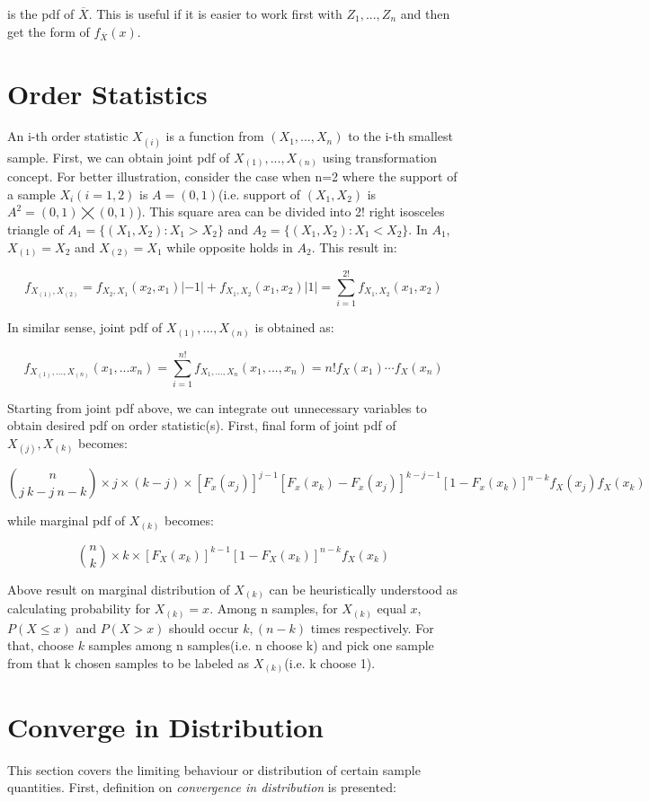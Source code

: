 \documentclass[10pt]{article}
\begin{document}
\noindent is the pdf of $\overline{X}$. This is useful if it is easier to work first with $Z_1,...,Z_n$ and then get the form of $f_{\overline{X}}(x)$.

\section{Order Statistics}
An i-th order statistic $X_{(i)}$ is a function from $(X_1,...,X_n)$ to the i-th smallest sample. First, we can obtain joint pdf of $X_{(1)},...,X_{(n)}$ using transformation concept. For better illustration, consider the case when n=2 where the support of a sample $X_i(i=1,2)$ is $A=(0,1)$(i.e. support of $(X_1, X_2)$ is $A^2=(0,1)\bigtimes (0,1)$). This square area can be divided into 2! right isosceles triangle of $A_1=\{(X_1, X_2):X_1>X_2\}$ and $A_2=\{(X_1, X_2):X_1<X_2\}$. In $A_1$, $X_{(1)}=X_2$ and $X_{(2)}=X_1$ while opposite holds in $A_2$. This result in:

$$
f_{X_{(1)}, X_{(2)}}=f_{X_2, X_1}(x_2,x_1)|-1|+f_{X_1, X_2}(x_1,x_2)|1|=\displaystyle \sum_{i=1}^{2!}f_{X_1, X_2}(x_1,x_2)
$$

\noindent In similar sense, joint pdf of $X_{(1)},...,X_{(n)}$ is obtained as:

$$
f_{X_{(1)},...,X_{(n)}}(x_1,...x_n)=\displaystyle \sum_{i=1}^{n!}f_{X_1,...,X_n}(x_1,...,x_n)=n!f_X(x_1)\cdots f_X(x_n)
$$

\noindent Starting from joint pdf above, we can integrate out unnecessary variables to obtain desired pdf on order statistic(s). First, final form of joint pdf of $X_{(j)}, X_{(k)}$ becomes:

$$
{n\choose j\ k-j\ n-k}\times j\times (k-j)\times [F_x(x_j)]^{j-1}[F_x(x_k)-F_x(x_j)]^{k-j-1}[1-F_x(x_k)]^{n-k}f_X(x_j)f_X(x_k)
$$

\noindent while marginal pdf of $X_{(k)}$ becomes:

$$
{n \choose k}\times k\times[F_X(x_k)]^{k-1}[1-F_X(x_k)]^{n-k}f_X(x_k)
$$

\noindent Above result on marginal distribution of $X_{(k)}$ can be heuristically understood as calculating probability for $X_{(k)}=x$. Among n samples, for $X_{(k)}$ equal $x$, $P(X \leq x)$ and $P(X > x)$ should occur $k, (n-k)$ times respectively. For that, choose $k$ samples among n samples(i.e. n choose k) and pick one sample from that k chosen samples to be labeled as $X_{(k)}$(i.e. k choose 1).

\section{Converge in Distribution}
This section covers the limiting behaviour or distribution of certain sample quantities. First, definition on \textit{convergence in distribution} is presented:\bigskip
\end{document}
